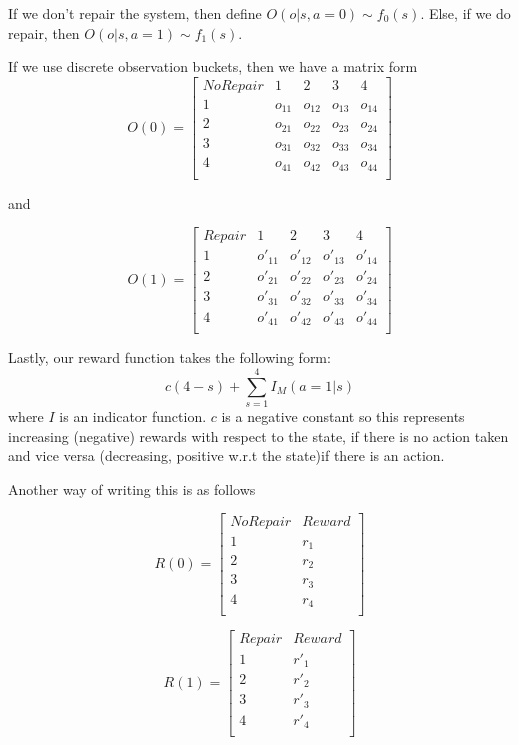 \documentclass[english]{article}
\numberwithin{equation}{section}
\begin{document}
If we don't repair the system, then define $O(o|s,a=0) \sim f_0(s)$. Else, if we do repair, then $O(o|s,a=1) \sim f_1(s)$.

If we use discrete observation buckets, then we have a matrix form
$$    O(0) = 
\begin{bmatrix}
	No Repair & 1 & 2 & 3 & 4 \\
	1 & o_{11} & o_{12} & o_{13} & o_{14} \\
	2 & o_{21} & o_{22} & o_{23} & o_{24} \\
	3 & o_{31} & o_{32} & o_{33} & o_{34} \\
	4 & o_{41} & o_{42} & o_{43} & o_{44} \\
	\end{bmatrix}
$$

and

$$    O(1) = 
\begin{bmatrix}
Repair & 1 & 2 & 3 & 4 \\
1 & o'_{11} & o'_{12} & o'_{13} & o'_{14} \\
2 & o'_{21} & o'_{22} & o'_{23} & o'_{24} \\
3 & o'_{31} & o'_{32} & o'_{33} & o'_{34} \\
4 & o'_{41} & o'_{42} & o'_{43} & o'_{44} \\
\end{bmatrix}
$$

Lastly, our reward function takes the following form:
$$c(4-s) + \sum_{s=1}^4 I_M(a=1|s)$$ where $I$ is an indicator function. $c$ is a negative constant so this represents increasing (negative) rewards with respect to the state, if there is no action taken and vice versa (decreasing, positive w.r.t the state)if there is an action.

Another way of writing this is as follows

$$
R(0) = 
\begin{bmatrix}
	No Repair & Reward \\
	1 & r_1 \\
	2 & r_2 \\
	3 & r_3 \\
	4 & r_4 \\
	\end{bmatrix}
$$

$$
R(1) = 
\begin{bmatrix}
Repair & Reward \\
1 & r'_1 \\
2 & r'_2 \\
3 & r'_3 \\
4 & r'_4 \\
\end{bmatrix}
$$
\end{document}
